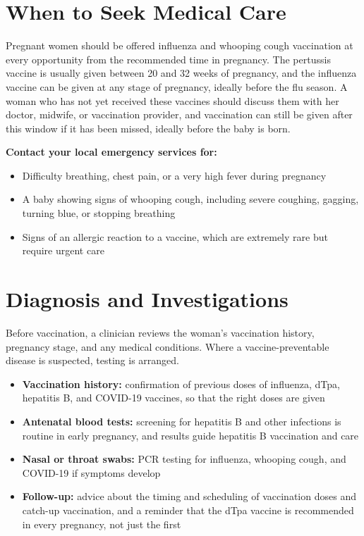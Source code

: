 \section*{When to Seek Medical Care}
Pregnant women should be offered influenza and whooping cough vaccination at every opportunity from the recommended time in pregnancy. The pertussis vaccine is usually given between 20 and 32 weeks of pregnancy, and the influenza vaccine can be given at any stage of pregnancy, ideally before the flu season. A woman who has not yet received these vaccines should discuss them with her doctor, midwife, or vaccination provider, and vaccination can still be given after this window if it has been missed, ideally before the baby is born.

\textbf{Contact your local emergency services for:}
\begin{itemize}
    \item Difficulty breathing, chest pain, or a very high fever during pregnancy
    \item A baby showing signs of whooping cough, including severe coughing, gagging, turning blue, or stopping breathing
    \item Signs of an allergic reaction to a vaccine, which are extremely rare but require urgent care
\end{itemize}

\section*{Diagnosis and Investigations}
Before vaccination, a clinician reviews the woman's vaccination history, pregnancy stage, and any medical conditions. Where a vaccine-preventable disease is suspected, testing is arranged.

\begin{itemize}
    \item \textbf{Vaccination history:} confirmation of previous doses of influenza, dTpa, hepatitis B, and COVID-19 vaccines, so that the right doses are given
    \item \textbf{Antenatal blood tests:} screening for hepatitis B and other infections is routine in early pregnancy, and results guide hepatitis B vaccination and care
    \item \textbf{Nasal or throat swabs:} PCR testing for influenza, whooping cough, and COVID-19 if symptoms develop
    \item \textbf{Follow-up:} advice about the timing and scheduling of vaccination doses and catch-up vaccination, and a reminder that the dTpa vaccine is recommended in every pregnancy, not just the first
\end{itemize}

